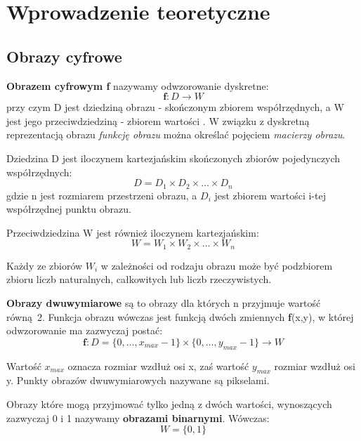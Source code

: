 \documentclass[a4paper,12pt,twoside,openany]{report}
\begin{document}
\chapter{Wprowadzenie teoretyczne}
\section{Obrazy cyfrowe}
\textbf{Obrazem cyfrowym f} nazywamy odwzorowanie dyskretne: 
\begin{equation}
	 \textbf{f} \colon D \to W  
\end{equation}
przy czym D jest dziedziną obrazu - skończonym zbiorem współrzędnych, a W jest jego przeciwdziedziną - zbiorem wartości \cite{Iwanowski}. W związku z dyskretną reprezentacją obrazu \textit{funkcję obrazu} można określać pojęciem \textit{macierzy obrazu}.

Dziedzina D jest iloczynem kartezjańskim skończonych zbiorów pojedynczych współrzędnych:
\begin{equation}
	 D = D_{1} \times D_{2}  \times \ldots  \times D_{n} 
\end{equation}
gdzie n jest rozmiarem przestrzeni obrazu, a $ D_{i} $ jest zbiorem wartości i-tej współrzędnej punktu obrazu. 

Przeciwdziedzina W jest również iloczynem kartezjańskim:
\begin{equation}
	 W = W_{1} \times W_{2}  \times \ldots  \times W_{n} 
\end{equation}

Każdy ze zbiorów $ W_{i} $ w zależności od rodzaju obrazu może być podzbiorem zbioru liczb naturalnych, całkowitych lub liczb rzeczywistych.

\textbf{Obrazy dwuwymiarowe} są to obrazy dla których n przyjmuje wartość równą~2. Funkcja obrazu wówczas jest funkcją dwóch zmiennych \textbf{f}(x,y), w której odwzorowanie ma zazwyczaj postać:
\begin{equation}
	 \textbf{f} \colon D = \{0, \ldots, x_{max}-1\} \times \{0, \ldots, y_{max}-1\} \to W  
\end{equation}

Wartość $ x_{max} $ oznacza rozmiar wzdłuż osi x, zaś wartość $ y_{max} $ rozmiar wzdłuż osi y. Punkty obrazów dwuwymiarowych nazywane są pikselami.

Obrazy które mogą przyjmować tylko jedną z dwóch wartości, wynoszących zazwyczaj 0 i 1 nazywamy \textbf{obrazami binarnymi}. Wówczas:
\begin{equation}
	 W = \{0,1\}  
\end{equation}
\end{document}
